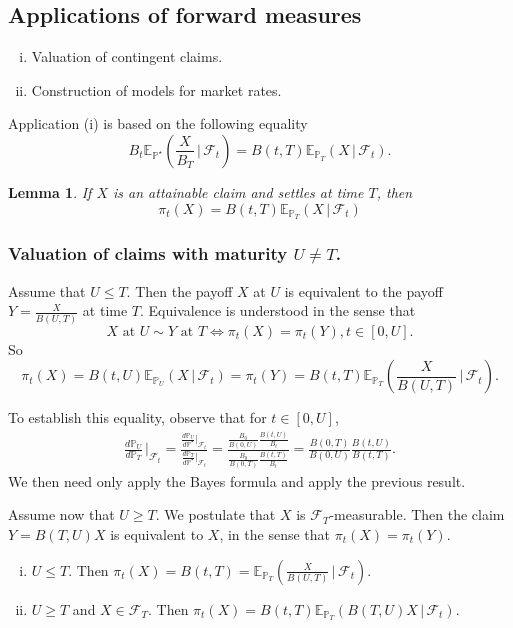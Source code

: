 \documentclass[10pt, oneside, reqno]{amsbook}
\theoremstyle{plain}%
\newtheorem{lem}[thm]{Lemma}
\theoremstyle{definition}
\theoremstyle{remark}
\newcommand{\given}{ \, | \,}
\newcommand{\sigf}{\mathcal{F}}
\newcommand{\E}{\mathbb{E}}
\renewcommand{\P}{\mathbb{P}}
\numberwithin{equation}{chapter}
\begin{document}
\subsection{Applications of forward measures} %
\label{sub:applications_of_forward_measures}
\begin{enumerate}[(i)]
	\item Valuation of contingent claims.
	\item Construction of models for market rates.
\end{enumerate}  Application (i) is based on the following equality \[
	B_t \E_{\P^\star} \left( \frac{X}{B_T} \given \sigf_t \right) = B(t, T) \E_{\P_T} \left( X \given \sigf_t \right).
\]

\begin{lem}
	If $X$ is an attainable claim and settles at time $T$, then \[
		\pi_t(X) = B(t, T) \E_{\P_T} \left( X \given \sigf_t \right)
	\]
\end{lem}

\subsubsection{Valuation of claims with maturity $U \neq T$.}
Assume that $U \leq T$. Then the payoff $X$ at $U$ is equivalent to the payoff $Y = \frac{X}{B(U, T)}$ at time $T$.  Equivalence is understood in the sense that \[
	\text{$X$ at $U$} \sim \text{$Y$ at $T$} \iff \pi_t(X) = \pi_t(Y), t \in [0, U].
\]  So \[
	\pi_t(X) = B(t, U) \E_{\P_U} \left( X \given \sigf_t \right) = \pi_t(Y) = B(t, T) \E_{\P_T} \left( \frac{X}{B(U, T)} \given \sigf_t \right).
\]

To establish this equality, observe that for $t \in [0, U]$, \begin{align*}
	\frac{d \P_U}{d \P_T} \, |_{\sigf_t} = \frac{ \frac{d\P_U}{d\P^\star} |_{\sigf_t}}{\frac{d\P_T}{d\P^\star} |_{\sigf_t}} = \frac{ \frac{B_0}{B(0, U)} \frac{B(t, U)}{B_t}}{\frac{B_0}{B(0, T)}\frac{B(t, T)}{B_t}} = \frac{B(0, T)}{B(0, U)}\frac{B(t, U)}{B(t, T)}.
\end{align*}  We then need only apply the Bayes formula and apply the previous result.

Assume now that $U \geq T$. We postulate that $X$ is $\sigf_T$-measurable. Then the claim $Y = B(T, U) X$ is equivalent to $X$, in the sense that $\pi_t(X) = \pi_t(Y)$.

\begin{enumerate}[(i)]
	\item $U \leq T$.  Then $\pi_t(X) = B(t, T) = \E_{\P_T} \left( \frac{X}{B(U, T)} \given \sigf_t \right)$.  
	\item $U \geq T$ and $X \in \sigf_T$.  Then $\pi_t(X) = B(t, T) \E_{\P_T} \left( B(T, U) X \given \sigf_t \right)$.
\end{enumerate}
\end{document}
